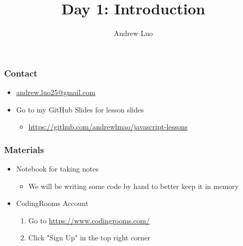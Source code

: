 \documentclass{beamer}
\title{Day 1: Introduction}
\author{Andrew Luo}
\begin{document}
\maketitle
\begin{frame}
\frametitle{Contact}
\begin{itemize}
\item{\href{mailto:andrew.luo25@gmail.com}{andrew.luo25@gmail.com}}
\item{Go to my GitHub Slides for lesson slides}
	\begin{itemize}
		\item{\url{https://github.com/andrewlmao/javascript-lessons}}
	\end{itemize}
\end{itemize}
\end{frame}

\begin{frame}
\frametitle{Materials}
\begin{itemize}
	\item{Notebook for taking notes}
	\begin{itemize}
		\item{We will be writing some code by hand to better keep it in memory}
	\end{itemize}
	\item{CodingRooms Account}
		\begin{enumerate}
			\item{Go to \url{https://www.codingrooms.com/}}
			\item{Click "Sign Up" in the top right corner}
		\end{enumerate}
\end{itemize}
\end{frame}
\end{document}
